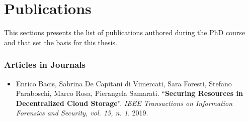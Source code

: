 \section{Publications}

This sections presents the list of publications authored during the PhD course and that set the basis for this thesis.
			
			
\subsubsection*{Articles in Journals}
\begin{itemize}
	\item Enrico Bacis, Sabrina De Capitani di Vimercati, Sara Foresti, Stefano Paraboschi,	Marco Rosa,	Pierangela Samarati. ``\textbf{Securing Resources in Decentralized Cloud Storage}''. {\em IEEE Transactions on Information Forensics and Security, vol. 15, n. 1}. 2019.
\end{itemize}

